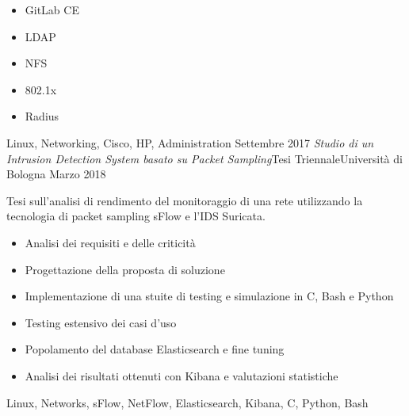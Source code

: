 \begin{experiences}
{\begin{itemize}
                        \item GitLab CE
                        \item LDAP
                        \item NFS
                        \item 802.1x
                        \item Radius
                      \end{itemize}
                    }
                    {Linux, Networking, Cisco, HP, Administration}
  \emptySeparator
  \experience
    {Settembre 2017}   {\it{Studio di un Intrusion Detection System basato su Packet Sampling}}{Tesi Triennale}{Universit\`a di Bologna}
    {Marzo 2018} {
                      Tesi sull'analisi di rendimento del monitoraggio di una rete utilizzando la tecnologia di packet sampling sFlow e l'IDS
                      Suricata.
                      \begin{itemize}
                        \item Analisi dei requisiti e delle criticit\`a
                        \item Progettazione della proposta di soluzione
                        \item Implementazione di una stuite di testing e simulazione in C, Bash e Python
                        \item Testing estensivo dei casi d'uso
                        \item Popolamento del database Elasticsearch e fine tuning
                        \item Analisi dei risultati ottenuti con Kibana e valutazioni statistiche
                      \end{itemize}
                    }
                    {Linux, Networks, sFlow, NetFlow, Elasticsearch, Kibana, C, Python, Bash}
  \emptySeparator
\end{experiences}
